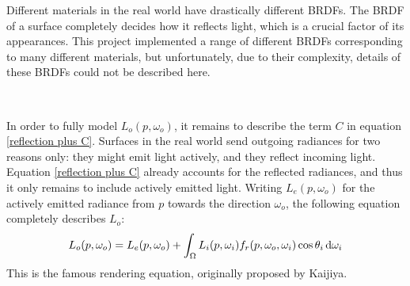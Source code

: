 Different materials in the real world have drastically different BRDFs. The BRDF of a surface completely decides how it reflects light, which is a crucial factor of its appearances. This project implemented a range of different BRDFs corresponding to many different materials, but unfortunately, due to their complexity, details of these BRDFs could not be described here. 

~

In order to fully model $L_o(p,\omega_o)$, it remains to describe the term $C$ in equation \ref{reflection plus C}. Surfaces in the real world send outgoing radiances for two reasons only: they might emit light actively, and they reflect incoming light. Equation \ref{reflection plus C} already accounts for the reflected radiances, and thus it only remains to include actively emitted light. Writing $L_e(p,\omega_o)$ for the actively emitted radiance from $p$ towards the direction $\omega_o$, the following equation completely describes $L_o$:
\begin{align}
    L_o(p,\omega_o) = L_e(p,\omega_o) + \int_\Omega L_i(p,\omega_i)f_r(p,\omega_o,\omega_i)\cos\theta_i\,\mathrm{d}\omega_i
    \label{rendering equation}
\end{align}
This is the famous rendering equation, originally proposed by Kaijiya\cite{rendering_equation}. 


